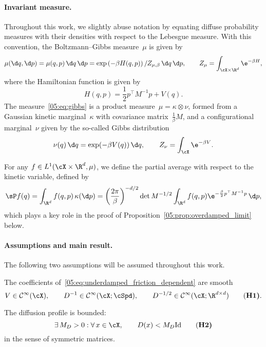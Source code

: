 \paragraph{Invariant measure.}
Throughout this work, we slightly abuse notation by equating diffuse probability measures with their densities with respect to the Lebesgue measure. With this convention, the Boltzmann--Gibbs measure~$\mu$ is given by
\begin{equation}
    \label{05:eq:boltzmann_gibbs}
    \mu(\d q,\d p) = \mu(q,p)\,\d q\,\d p = \exp\left(-\beta H(q,p)\right)/Z_{\mu,\beta}\,\d q\,\d p,\qquad Z_{\mu}=\int_{\cX\times\R^d}\e^{-\beta H},
\end{equation}
where the Hamiltonian function is given by
\begin{equation}
    \label{05:eq:hamiltonian_mass_dependent}
    H(q,p) = \frac12 p^\top M^{-1}p + V(q).
\end{equation}
The measure~\eqref{05:eq:gibbs} is a product measure~$\mu=\kappa\otimes\nu$, formed from a Gaussian kinetic marginal~$\kappa$ with covariance matrix~$\frac1\beta M$, and a configurational marginal~$\nu$ given by the so-called Gibbs distribution
\begin{equation}
    \label{05:eq:gibbs}
    \nu(q)\,\d q = \exp(-\beta V(q))\,\d q,\qquad Z_{\nu}=\int_{\cX}\e^{-\beta V}.
\end{equation}

For any $f\in L^1(\cX\times \R^d,\mu)$, we define the partial average with respect to the kinetic variable, defined by
\begin{equation}
    \label{05:eq:kappa_proj}
    \sP f(q) = \int_{\R^d}f(q,p)\,\kappa(\d p) = \left(\frac{2\pi}{\beta}\right)^{-d/2}\det M^{-1/2}\int_{\R^d}f(q,p)\e^{-\frac{\beta}{2}p^\top M^{-1}p}\,\d p,
\end{equation}
which plays a key role in the proof of Proposition~\ref{05:prop:overdamped_limit} below.
\paragraph{Assumptions and main result.}
The following two assumptions will be assumed throughout this work.
\begin{hypothesis}
    The coefficients of~\eqref{05:eq:underdamped_friction_dependent} are smooth
    \begin{equation}
        \label{05:hyp:smoothness}
        V\in\mathcal C^\infty(\cX),\qquad D^{-1}\in\mathcal C^\infty(\cX;\cSpd),\qquad D^{-1/2}\in\mathcal C^\infty(\cX;\R^{d\times d})\tag{\bf{H1}}.
    \end{equation}
    \end{hypothesis}
    \begin{hypothesis}
        The diffusion profile is bounded:
        \begin{equation}
            \label{05:hyp:elliptic}
            \exists\,M_D >0:\forall\,x\in\cX,\qquad D(x) < M_D \mathrm{Id}\tag{\bf{H2}}
        \end{equation}
        in the sense of symmetric matrices.
        \end{hypothesis}

